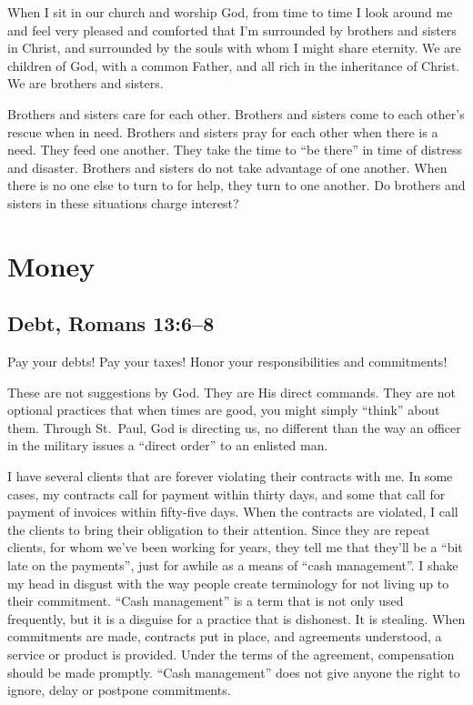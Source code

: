 \documentclass[12pt]{memoir}
\begin{document}
When I sit in our church and worship God, from time to time I look
around me and feel very pleased and comforted that I'm surrounded
by brothers and sisters in Christ, and surrounded by the souls with
whom I might share eternity. We are children of God, with a common
Father, and all rich in the inheritance of Christ. We are brothers
and sisters. 

Brothers and sisters care for each other. Brothers and sisters come
to each other's rescue when in need. Brothers and sisters pray for
each other when there is a need. They feed one another. They take
the time to ``be there'' in time of distress and disaster. Brothers
and sisters do not take advantage of one another. When there is no
one else to turn to for help, they turn to one another. Do brothers
and sisters in these situations charge interest?

\section{Money}

\subsection{Debt, Romans 13:6--8}

Pay your debts! Pay your taxes! Honor your responsibilities and commitments!

These are not suggestions by God. They are His direct commands. They
are not optional practices that when times are good, you might simply
``think'' about them.
Through St.~Paul, God is directing us, no
different than the way an officer in the military issues a ``direct
order'' to an enlisted man.

I have several clients that are forever violating their contracts
with me. In some cases, my contracts call for payment within thirty
days, and some that call for payment of invoices within fifty-five
days. When the contracts are violated, I call the clients to bring
their obligation to their attention. Since they are repeat clients,
for whom we've been working for years, they tell me that they'll be
a ``bit late on the payments'', just for awhile as a means of ``cash
management''. I shake my head in disgust with the way people create
terminology for not living up to their commitment. ``Cash management''
is a term that is not only used frequently, but it is a disguise for
a practice that is dishonest. It is stealing. When commitments are
made, contracts put in place, and agreements understood, a service
or product is provided. Under the terms of the agreement, compensation
should be made promptly. ``Cash management'' does not give anyone
the right to ignore, delay or postpone commitments. 
\end{document}
